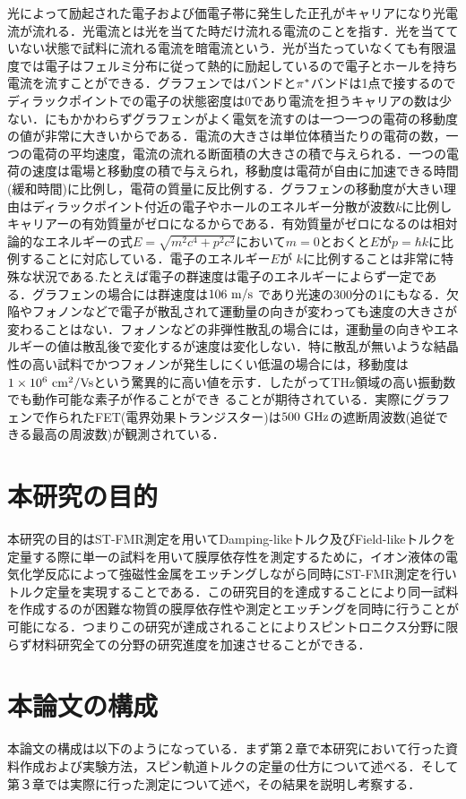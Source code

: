 光によって励起された電子および価電子帯に発生した正孔がキャリアになり光電流が流れる．光電流とは光を当てた時だけ流れる電流のことを指す．光を当てていない状態で試料に流れる電流を暗電流という．光が当たっていなくても有限温度では電子はフェルミ分布に従って熱的に励起しているので電子とホールを持ち電流を流すことができる．グラフェンでは\pi バンドと$\rm\pi^{*}$バンドは1点で接するのでディラックポイントでの電子の状態密度は0であり電流を担うキャリアの数は少ない．にもかかわらずグラフェンがよく電気を流すのは一つ一つの電荷の移動度の値が非常に大きいからである．電流の大きさは単位体積当たりの電荷の数，一つの電荷の平均速度，電流の流れる断面積の大きさの積で与えられる．一つの電荷の速度は電場と移動度の積で与えられ，移動度は電荷が自由に加速できる時間(緩和時間)に比例し，電荷の質量に反比例する．グラフェンの移動度が大きい理由はディラックポイント付近の電子やホールのエネルギー分散が波数$k$に比例しキャリアーの有効質量がゼロになるからである．有効質量がゼロになるのは相対論的なエネルギーの式$E = \sqrt{m^{2}c^{4} + p^{2}c^{2}}$において$m=0$とおくと$E$が$p=\hbar k$に比例することに対応している．電子のエネルギー$E$が $k$に比例することは非常に特殊な状況である.たとえば電子の群速度は電子のエネルギーによらず一定である．グラフェンの場合には群速度は$106\rm\ m/s$ であり光速の300分の1にもなる．欠陥やフォノンなどで電子が散乱されて運動量の向きが変わっても速度の大きさが変わることはない．フォノンなどの非弾性散乱の場合には，運動量の向きやエネルギーの値は散乱後で変化するが速度は変化しない．特に散乱が無いような結晶性の高い試料でかつフォノンが発生しにくい低温の場合には，移動度は$1\times10^{6}\rm\ cm^{2}/Vs$という驚異的に高い値を示す．したがってTHz領域の高い振動数でも動作可能な素子が作ることができ ることが期待されている．実際にグラフェンで作られたFET(電界効果トランジスター)は$500\rm\ GHz$の遮断周波数(追従できる最高の周波数)が観測されている．

\section{本研究の目的}
本研究の目的はST-FMR測定を用いてDamping-likeトルク及びField-likeトルクを定量する際に単一の試料を用いて膜厚依存性を測定するために，イオン液体の電気化学反応によって強磁性金属をエッチングしながら同時にST-FMR測定を行いトルク定量を実現することである．この研究目的を達成することにより同一試料を作成するのが困難な物質の膜厚依存性や測定とエッチングを同時に行うことが可能になる．つまりこの研究が達成されることによりスピントロニクス分野に限らず材料研究全ての分野の研究進度を加速させることができる．

\section{本論文の構成}
本論文の構成は以下のようになっている．まず第２章で本研究において行った資料作成および実験方法，スピン軌道トルクの定量の仕方について述べる．そして第３章では実際に行った測定について述べ，その結果を説明し考察する．




